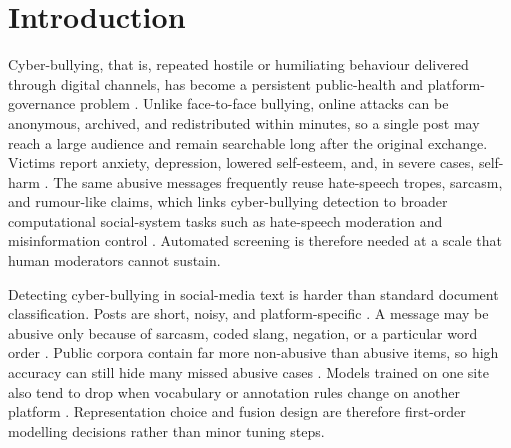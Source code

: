 \documentclass[journal]{IEEEtran}
\begin{document}
\maketitle

\IEEEdisplaynontitleabstractindextext

\pagestyle{plain}

\section{Introduction}

Cyber-bullying, that is, repeated hostile or humiliating behaviour delivered through digital channels, has become a persistent public-health and platform-governance problem \cite{ref1,ref39}. Unlike face-to-face bullying, online attacks can be anonymous, archived, and redistributed within minutes, so a single post may reach a large audience and remain searchable long after the original exchange. Victims report anxiety, depression, lowered self-esteem, and, in severe cases, self-harm \cite{ref39,ref42}. The same abusive messages frequently reuse hate-speech tropes, sarcasm, and rumour-like claims, which links cyber-bullying detection to broader computational social-system tasks such as hate-speech moderation and misinformation control \cite{ref11,ref36,ref41}. Automated screening is therefore needed at a scale that human moderators cannot sustain.

Detecting cyber-bullying in social-media text is harder than standard document classification. Posts are short, noisy, and platform-specific \cite{ref12}. A message may be abusive only because of sarcasm, coded slang, negation, or a particular word order \cite{ref2,ref4,ref37}. Public corpora contain far more non-abusive than abusive items, so high accuracy can still hide many missed abusive cases \cite{ref23}. Models trained on one site also tend to drop when vocabulary or annotation rules change on another platform \cite{ref13}. Representation choice and fusion design are therefore first-order modelling decisions rather than minor tuning steps.
\end{document}
